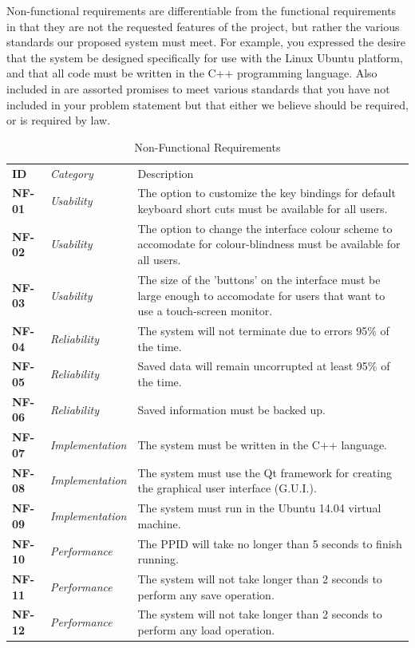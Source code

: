 \documentclass[12pt,letterpaper]{article}
\begin{document}
Non-functional requirements are differentiable from the functional requirements in that they are not the requested features of the project, but
rather the various standards our proposed system must meet. For example, you expressed the desire that the system be designed specifically 
for use with the Linux Ubuntu platform, and that all code must be written in the C++ programming language. Also included in  are
assorted promises to meet various standards that you have not included in your problem statement but that either we believe should be required, 
or is required by law.

\begin{table}[H]
	\caption{Non-Functional Requirements}
	\begin{tabu} to 
	    \tableheader{}ID & Category & Description\\
		NF-01 & Usability & The option to customize the key bindings for default keyboard short cuts must be available for all users.\\
		NF-02 & Usability & The option to change the interface colour scheme to accomodate for colour-blindness must be available for all users.\\
		NF-03 & Usability & The size of the 'buttons' on the interface must be large enough to accomodate for users that want to use a touch-screen monitor.\\
		NF-04 & Reliability & The system will not terminate due to errors 95\% of the time.\\
		NF-05 & Reliability & Saved data will remain uncorrupted at least 95\% of the time. \\
		NF-06 & Reliability & Saved information must be backed up. \\
		NF-07 & Implementation & The system must be written in the C++ language. \\
		NF-08 & Implementation & The system must use the Qt framework for creating the graphical user interface (G.U.I.). \\
		NF-09 & Implementation & The system must run in the Ubuntu 14.04 virtual machine. \\
		NF-10 & Performance & The PPID will take no longer than 5 seconds to finish running. \\
		NF-11 & Performance & The system will not take longer than 2 seconds to perform any save operation. \\
		NF-12 & Performance & The system will not take longer than 2 seconds to perform any load operation. \\

\end{tabu}
\end{table}
\end{document}
